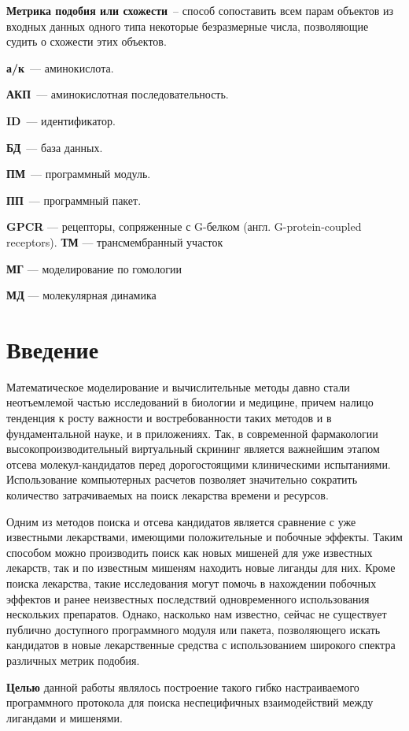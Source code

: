 \documentclass[a4paper,14pt]{article}         %
\begin{document}
\textbf{Метрика подобия или схожести}~-- способ сопоставить всем парам объектов из входных данных одного типа некоторые безразмерные числа, позволяющие судить о схожести этих объектов.

\textbf{а/к}~--- аминокислота.

\textbf{АКП}~--- аминокислотная последовательность.

\textbf{ID}~--- идентификатор.

\textbf{БД}~--- база данных.

\textbf{ПМ}~--- программный модуль.

\textbf{ПП}~--- программный пакет.

\textbf{GPCR} --- рецепторы, сопряженные с G-белком (англ. G-protein-coupled receptors).
\color{gray}
\textbf{ТМ} --- трансмембранный участок

\textbf{МГ} --- моделирование по гомологии

\textbf{МД} --- молекулярная динамика
\color{black}
\fi
\newpage
\section{Введение}
Математическое моделирование и вычислительные методы давно стали неотъемлемой частью исследований в биологии и медицине, причем налицо тенденция к росту важности и востребованности таких методов и в фундаментальной науке, и в приложениях. Так, в современной фармакологии высокопроизводительный виртуальный скрининг является важнейшим этапом отсева молекул-кандидатов перед дорогостоящими клиническими испытаниями. Использование компьютерных расчетов позволяет значительно сократить количество затрачиваемых на поиск лекарства времени и ресурсов.

Одним из методов поиска и отсева кандидатов является сравнение с уже известными лекарствами, имеющими положительные и побочные эффекты. Таким способом можно производить поиск как новых мишеней для уже известных лекарств, так и по известным мишеням находить новые лиганды для них. Кроме поиска лекарства, такие исследования могут помочь в нахождении побочных эффектов и ранее неизвестных последствий одновременного использования нескольких препаратов. Однако, насколько нам известно, сейчас не существует публично доступного программного модуля или пакета, позволяющего искать кандидатов в новые лекарственные средства с использованием широкого спектра различных метрик подобия.

\textbf{Целью} данной работы являлось построение такого гибко настраиваемого программного протокола для поиска неспецифичных взаимодействий между лигандами и мишенями. 
\end{document}
